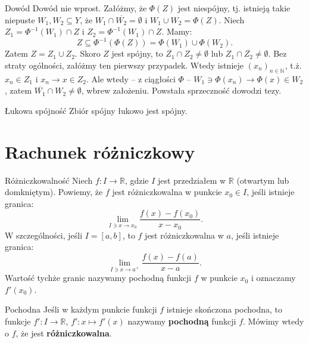 \documentclass{article}
\numberwithin{defi}{section}
\numberwithin{defi}{section}
\newcommand{\R}{\mathbb{R}}
\newcommand{\N}{\mathbb{N}}
\newcommand{\se}{\subseteq}
\providecommand{\ol}{\overline}
\newcommand{\ciag}[1]{(#1_{n})_{n \in \N}}
\begin{document}
\begin{dow}{Dowód}
    Dowód nie wprost. Załóżmy, że $\Phi(Z)$ jest niespójny, tj. istnieją takie niepuste $W_1, W_2 \se Y$, że $W_1 \cap \ol{W_2} = \emptyset$ i $W_1 \cup W_2 = \Phi(Z)$. Niech $Z_1 = \Phi^{-1}(W_1) \cap Z$ i $Z_2 = \Phi^{-1}(W_1) \cap Z$. Mamy: \begin{equation*}
        Z \se \Phi^{-1}(\Phi(Z)) = \Phi(W_1) \cup \Phi(W_2).
    \end{equation*} Zatem $Z = Z_1 \cup Z_2$. Skoro $Z$ jest spójny, to $\ol{Z_1} \cap Z_2 \neq \emptyset$ lub $Z_1 \cap \ol{Z_2} \neq \emptyset$. Bez straty ogólności, załóżmy ten pierwszy przypadek. Wtedy istnieje $\ciag{x}$, t.ż. $x_n \in Z_1$ i $x_n \to x \in Z_2$. Ale wtedy -- z ciągłości $\Phi$ -- $W_1 \ni \Phi(x_n) \to \Phi(x) \in W_2$, zatem $\ol{W_1} \cap W_2 \neq \emptyset$, wbrew założeniu. Powstała sprzeczność dowodzi tezy.
\end{dow}

\begin{obs}{Łukowa spójność}
    Zbiór spójny łukowo jest spójny.
\end{obs}





\newpage
\section{Rachunek różniczkowy}

    \begin{defr}{Różniczkowalność}
        Niech $f: I \to \R$, gdzie $I$ jest przedziałem w $\R$ (otwartym lub domkniętym). Powiemy, że $f$ jest różniczkowalna w punkcie $x_0 \in I$, jeśli istnieje granica: \begin{equation}
            \lim_{I \ni x \to x_0} \frac{f(x) - f(x_0)}{x - x_0}.
        \end{equation} W szczególności, jeśli $I = [a, b]$, to $f$ jest różniczkowalna w $a$, jeśli istnieje granica: \begin{equation}
            \lim_{I \ni x \to a^+} \frac{f(x) - f(a)}{x - a}.
        \end{equation} Wartość tychże granic nazywamy pochodną funkcji $f$ w punkcie $x_0$ i oznaczamy $f'(x_0)$. 
    \end{defr}

    \begin{defr}{Pochodna}
        Jeśli w każdym punkcie funkcji $f$ istnieje skończona pochodna, to funkcje $f': I \to \R$, $f': x \mapsto f'(x)$ nazywamy \textbf{pochodną} funkcji $f$. Mówimy wtedy o $f$, że jest \textbf{różniczkowalna}.
    \end{defr}
\end{document}
